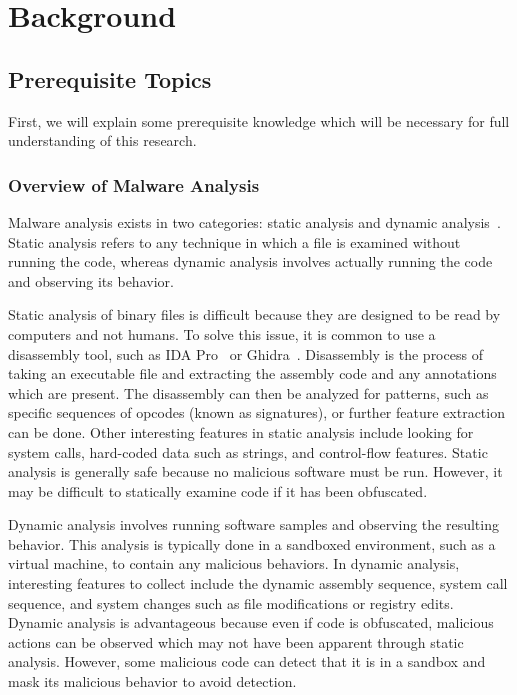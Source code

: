 \documentclass[../stegner_thesis.tex]{subfiles}
\begin{document}
\chapter{Background}%
\label{ch:background}

\section{Prerequisite Topics}%
\label{sec:bg_prereq}

\par First, we will explain some prerequisite knowledge which will be necessary
for full understanding of this research.

\subsection{Overview of Malware Analysis}%
\label{subsec:bg_malware_analysis}

\par Malware analysis exists in two categories: static analysis and dynamic
analysis~\cite{gadhiyaTechniquesMalware2013}.
Static analysis refers to any technique in which a file is examined without
running the code, whereas dynamic analysis involves actually running the code
and observing its behavior.

\par Static analysis of binary files is difficult because they are designed to
be read by computers and not humans.
To solve this issue, it is common to use a disassembly tool, such as IDA
Pro~\cite{IDAPro} or Ghidra~\cite{nsaGhidra}.
Disassembly is the process of taking an executable file and extracting the
assembly code and any annotations which are present.
The disassembly can then be analyzed for patterns, such as specific sequences
of opcodes (known as signatures), or further feature extraction can be done.
Other interesting features in static analysis include looking for system calls,
hard-coded data such as strings, and control-flow features.
Static analysis is generally safe because no malicious software must be run.
However, it may be difficult to statically examine code if it has been
obfuscated.

\par Dynamic analysis involves running software samples and observing the
resulting behavior.
This analysis is typically done in a sandboxed environment, such as a virtual
machine, to contain any malicious behaviors.
In dynamic analysis, interesting features to collect include the dynamic
assembly sequence, system call sequence, and system changes such as file
modifications or registry edits.
Dynamic analysis is advantageous because even if code is obfuscated, malicious
actions can be observed which may not have been apparent through static
analysis.
However, some malicious code can detect that it is in a sandbox and mask its
malicious behavior to avoid detection.
\end{document}
